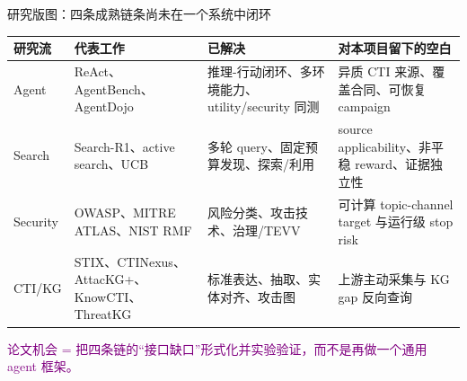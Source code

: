 \begin{frame}{研究版图：四条成熟链条尚未在一个系统中闭环}
\scriptsize
\begin{tabularx}{\textwidth}{p{} p{} X X}
\toprule
研究流 & 代表工作 & 已解决 & 对本项目留下的空白 \\
\midrule
Agent & ReAct、AgentBench、AgentDojo & 推理-行动闭环、多环境能力、utility/security 同测 & 异质 CTI 来源、覆盖合同、可恢复 campaign \\
Search & Search-R1、active search、UCB & 多轮 query、固定预算发现、探索/利用 & source applicability、非平稳 reward、证据独立性 \\
Security & OWASP、MITRE ATLAS、NIST RMF & 风险分类、攻击技术、治理/TEVV & 可计算 topic-channel target 与运行级 stop risk \\
CTI/KG & STIX、CTINexus、AttacKG+、KnowCTI、ThreatKG & 标准表达、抽取、实体对齐、攻击图 & 上游主动采集与 KG gap 反向查询 \\
\bottomrule
\end{tabularx}

\vspace{0.7em}
\begin{center}
\textcolor{Purple}{论文机会 = 把四条链的“接口缺口”形式化并实验验证，而不是再做一个通用 agent 框架。}
\end{center}
\end{frame}

